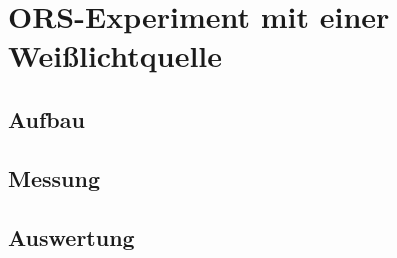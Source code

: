 \section{ORS-Experiment mit einer Weißlichtquelle}\label{sec:versuchsteil2}
\subsection{Aufbau}\label{subsec:teil2_aufbau}
\subsection{Messung}\label{subsec:teil2_messung}
\subsection{Auswertung}\label{subsec:teil2_auswertung}